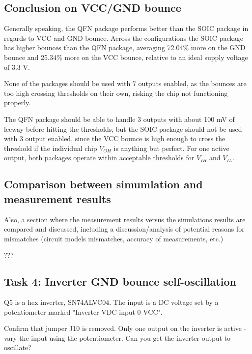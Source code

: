 \documentclass[../main.tex]{subfiles}
\begin{document}
\vspace{10pt}


\subsection{Conclusion on VCC/GND bounce}

\solution

Generally speaking, the QFN package performs better than the SOIC package in regards to VCC and GND bounce. Across the configurations the SOIC package has higher bounces than the QFN package, averaging 72.04\% more on the GND bounce and 25.34\% more on the VCC bounce, relative to an ideal supply voltage of 3.3 V. 

None of the packages should be used with 7 outputs enabled, as the bounces are too high crossing thresholds on their own, risking the chip not functioning properly. 

The QFN package should be able to handle 3 outputs with about 100 mV of leeway before hitting the thresholds, but the SOIC package should not be used with 3 output enabled, since the VCC bounce is high enough to cross the threshold if the individual chip $V_{OH}$ is anything but perfect. For one active output, both packages operate within acceptable thresholds for $V_{IH}$ and $V_{IL}$. 


\subsection{Comparison between simumlation and measurement results}

Also, a section where the measurement results versus the simulations results are compared and discussed, including a discussion/analysis of potential reasons for mismatches (circuit models mismatches, accuracy of measurements, etc.)
\solution

???

\subsection{Task 4: Inverter GND bounce self-oscillation}

Q5 is a hex inverter, SN74ALVC04. The input is a DC voltage set by a potentiometer marked "Inverter VDC input 0-VCC".

\vspace{10pt}

Confirm that jumper J10 is removed. Only one output on the inverter is active - vary the input using the potentiometer. Can you get the inverter output to oscillate?
\end{document}
